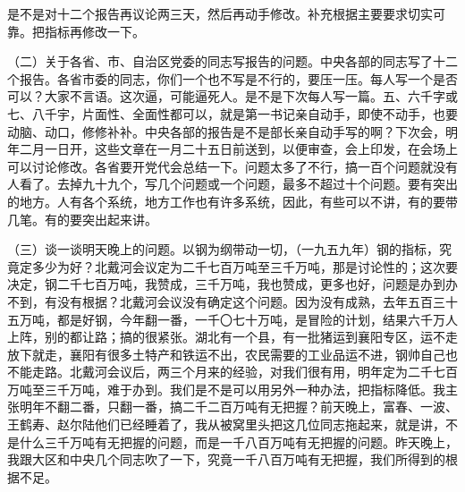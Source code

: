 是不是对十二个报告再议论两三天，然后再动手修改。补充根据主要要求切实可靠。把指标再修改一下。

（二）关于各省、市、自治区党委的同志写报告的问题。中央各部的同志写了十二个报告。各省市委的同志，你们一个也不写是不行的，要压一压。每人写一个是否可以？大家不言语。这次逼，可能逼死人。是不是下次每人写一篇。五、六千字或七、八千宇，片面性、全面性都可以，就是第一书记亲自动手，即使不动手，也要动脑、动口，修修补补。中央各部的报告是不是部长亲自动手写的啊？下次会，明年二月一日开，这些文章在一月二十五日前送到，以便审查，会上印发，在会场上可以讨论修改。各省要开党代会总结一下。问题太多了不行，搞一百个问题就没有人看了。去掉九十九个，写几个问题或一个问题，最多不超过十个问题。要有突出的地方。人有各个系统，地方工作也有许多系统，因此，有些可以不讲，有的要带几笔。有的要突出起来讲。

（三）谈一谈明天晚上的问题。以钢为纲带动一切，（一九五九年）钢的指标，究竟定多少为好？北戴河会议定为二千七百万吨至三千万吨，那是讨论性的；这次要决定，钢二千七百万吨，我赞成，三千万吨，我也赞成，更多也好，问题是办到办不到，有没有根据？北戴河会议没有确定这个问题。因为没有成熟，去年五百三十五万吨，都是好钢，今年翻一番，一千〇七十万吨，是冒险的计划，结果六千万人上阵，别的都让路；搞的很紧张。湖北有一个县，有一批猪运到襄阳专区，运不走放下就走，襄阳有很多土特产和铁运不出，农民需要的工业品运不进，钢帅自己也不能走路。北戴河会议后，两三个月来的经验，对我们很有用，明年定为二千七百万吨至三千万吨，难于办到。我们是不是可以用另外一种办法，把指标降低。我主张明年不翻二番，只翻一番，搞二千二百万吨有无把握？前天晚上，富春、一波、王鹤寿、赵尔陆他们已经睡着了，我从被窝里头把这几位同志拖起来，就是讲，不是什么三千万吨有无把握的问题，而是一千八百万吨有无把握的问题。昨天晚上，我跟大区和中央几个同志吹了一下，究竟一千八百万吨有无把握，我们所得到的根据不足。

